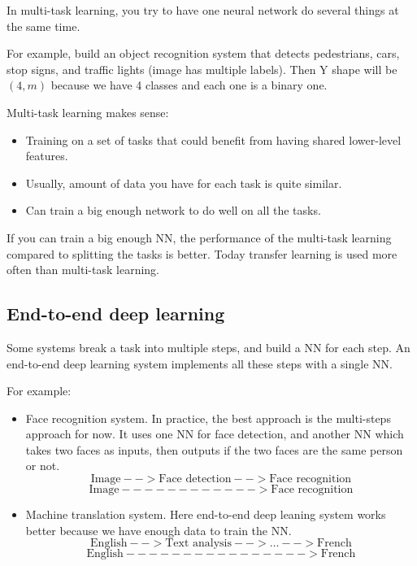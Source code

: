 \documentclass{article}
\begin{document}
\noindent In multi-task learning, you try to have one neural network do several things at the same time.

\bigskip

\noindent For example, build an object recognition system that detects pedestrians, cars, stop signs, and traffic lights (image has multiple labels). Then Y shape will be \((4,m)\) because we have 4 classes and each one is a binary one.

\bigskip

\noindent Multi-task learning makes sense:

\begin{itemize}
    \item Training on a set of tasks that could benefit from having shared lower-level features.
    \item Usually, amount of data you have for each task is quite similar.
    \item Can train a big enough network to do well on all the tasks.
\end{itemize}

\noindent If you can train a big enough NN, the performance of the multi-task learning compared to splitting the tasks is better. Today transfer learning is used more often than multi-task learning.

\subsection{End-to-end deep learning}

\noindent Some systems break a task into multiple steps, and build a NN for each step. An end-to-end deep learning system implements all these steps with a single NN.

\bigskip

\noindent For example:

\begin{itemize}
    \item Face recognition system. In practice, the best approach is the multi-steps approach for now. It uses one NN for face detection, and another NN which takes two faces as inputs, then outputs if the two faces are the same person or not.
\[\text{Image} --> \text{Face detection} --> \text{Face recognition}\]
\[\text{Image} ------------> \text{Face recognition}\]
    \item Machine translation system. Here end-to-end deep leaning system works better because we have enough data to train the NN.
\[\text{English} --> \text{Text analysis} --> \dots --> \text{French}\]
\[\text{English} ----------------> \text{French}\]
\end{itemize}
\end{document}
